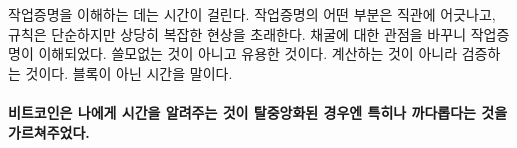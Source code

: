 \begin{comment}
	Understanding proof-of-work takes time. It is often counter-intuitive,
	and while the rules are simple, they lead to quite complex phenomena.
	For me, shifting my perspective on mining helped. Useful, not useless.
	Validation, not computation. Time, not blocks.
\end{comment}
작업증명을 이해하는 데는 시간이 걸린다.
작업증명의 어떤 부분은 직관에 어긋나고, 규칙은 단순하지만 상당히 복잡한 현상을 초래한다. 
채굴에 대한 관점을 바꾸니 작업증명이 이해되었다. 쓸모없는 것이 아니고 유용한 것이다. 
계산하는 것이 아니라 검증하는 것이다. 블록이 아닌 시간을 말이다.


\paragraph{비트코인은 나에게 시간을 알려주는 것이 탈중앙화된 경우엔 특히나 까다롭다는 것을 가르쳐주었다.}

%
%
%
%
%
%
%
